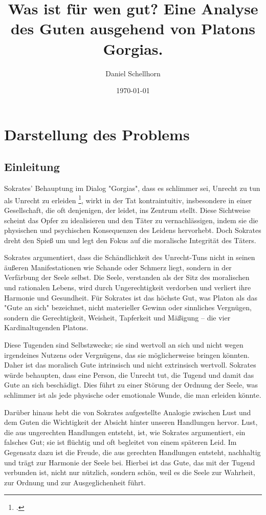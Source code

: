 \documentclass[12pt,a4paper]{article}
\title{Was ist für wen gut? Eine Analyse des Guten ausgehend von Platons Gorgias.}
\author{Daniel Schellhorn}
\date{\today}
\begin{document}
\maketitle

\section{Darstellung des Problems}
\subsection[short]{Einleitung}
Sokrates' Behauptung im Dialog "Gorgias", dass es schlimmer sei, Unrecht zu tun als Unrecht zu erleiden \footcite[475
e]{plato1967}, wirkt in der Tat kontraintuitiv, insbesondere in einer Gesellschaft, die oft denjenigen, der leidet, ins Zentrum stellt. Diese Sichtweise scheint das Opfer zu idealisieren und den Täter zu vernachlässigen, indem sie die physischen und psychischen Konsequenzen des Leidens hervorhebt. Doch Sokrates dreht den Spieß um und legt den Fokus auf die moralische Integrität des Täters.

Sokrates argumentiert, dass die Schändlichkeit des Unrecht-Tuns nicht in seinen äußeren Manifestationen wie Schande oder Schmerz liegt, sondern in der Verfärbung der Seele selbst. Die Seele, verstanden als der Sitz des moralischen und rationalen Lebens, wird durch Ungerechtigkeit verdorben und verliert ihre Harmonie und Gesundheit.  Für Sokrates ist das höchste Gut, was Platon als das "Gute an sich" bezeichnet, nicht materieller Gewinn oder sinnliches Vergnügen, sondern die Gerechtigkeit, Weisheit, Tapferkeit und Mäßigung – die vier Kardinaltugenden Platons.

Diese Tugenden sind Selbstzwecke; sie sind wertvoll an sich und nicht wegen irgendeines Nutzens oder Vergnügens, das sie möglicherweise bringen könnten. Daher ist das moralisch Gute intrinsisch und nicht extrinsisch wertvoll. Sokrates würde behaupten, dass eine Person, die Unrecht tut, die Tugend und damit das Gute an sich beschädigt. Dies führt zu einer Störung der Ordnung der Seele, was schlimmer ist als jede physische oder emotionale Wunde, die man erleiden könnte.

Darüber hinaus hebt die von Sokrates aufgestellte Analogie zwischen Lust und dem Guten die Wichtigkeit der Absicht hinter unseren Handlungen hervor. Lust, die aus ungerechten Handlungen entsteht, ist, wie Sokrates argumentiert, ein falsches Gut; sie ist flüchtig und oft begleitet von einem späteren Leid. Im Gegensatz dazu ist die Freude, die aus gerechten Handlungen entsteht, nachhaltig und trägt zur Harmonie der Seele bei. Hierbei ist das Gute, das mit der Tugend verbunden ist, nicht nur nützlich, sondern schön, weil es die Seele zur Wahrheit, zur Ordnung und zur Ausgeglichenheit führt.
\end{document}
